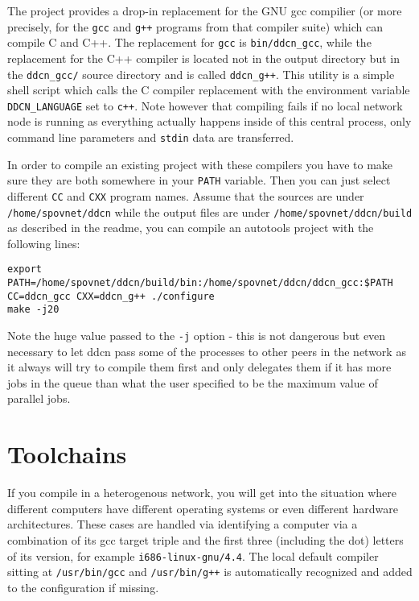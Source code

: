 \documentclass[a4paper,9pt]{scrartcl}
\begin{document}
The project provides a drop-in replacement for the GNU gcc compilier (or more precisely, for the \texttt{gcc} and \texttt{g++} programs from that compiler suite) which can compile C and C++. The replacement for \texttt{gcc} is \texttt{bin/ddcn\_gcc}, while the replacement for the C++ compiler is located not in the output directory but in the \texttt{ddcn\_gcc/} source directory and is called \texttt{ddcn\_g++}. This utility is a simple shell script which calls the C compiler replacement with the environment variable \texttt{DDCN\_LANGUAGE} set to \texttt{c++}. Note however that compiling fails if no local network node is running as everything actually happens inside of this central process, only command line parameters and \texttt{stdin} data are transferred.

In order to compile an existing project with these compilers you have to make sure they are both somewhere in your \texttt{PATH} variable. Then you can just select different \texttt{CC} and \texttt{CXX} program names. Assume that the sources are under \texttt{/home/spovnet/ddcn} while the output files are under \texttt{/home/spovnet/ddcn/build} as described in the readme, you can compile an autotools project with the following lines:

\begin{verbatim}
export PATH=/home/spovnet/ddcn/build/bin:/home/spovnet/ddcn/ddcn_gcc:$PATH
CC=ddcn_gcc CXX=ddcn_g++ ./configure
make -j20
\end{verbatim} 

Note the huge value passed to the \texttt{-j} option - this is not dangerous but even necessary to let ddcn pass some of the processes to other peers in the network as it always will try to compile them first and only delegates them if it has more jobs in the queue than what the user specified to be the maximum value of parallel jobs.

\section{Toolchains}

If you compile in a heterogenous network, you will get into the situation where different computers have different operating systems or even different hardware architectures. These cases are handled via identifying a computer via a combination of its gcc target triple and the first three (including the dot) letters of its version, for example \texttt{i686-linux-gnu/4.4}. The local default compiler sitting at \texttt{/usr/bin/gcc} and \texttt{/usr/bin/g++} is automatically recognized and added to the configuration if missing.
\end{document}
